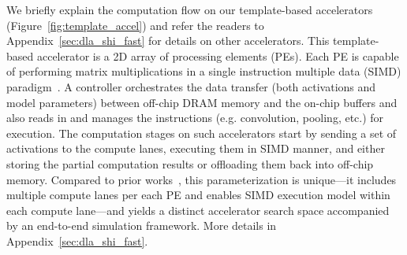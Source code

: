 %
We briefly explain the computation flow on our template-based accelerators (Figure~\ref{fig:template_accel}) and refer the readers to Appendix~\ref{sec:dla_shi_fast} for details on other accelerators.
%
This template-based accelerator is a 2D array of processing elements (PEs). Each PE is capable of performing matrix multiplications in a single instruction multiple data (SIMD) paradigm~\citep{simd}. A controller orchestrates the data transfer (both activations and model parameters) between off-chip DRAM memory and the on-chip buffers and also reads in and manages the instructions (e.g. convolution, pooling, etc.) for execution. The computation stages on such accelerators start by sending a set of activations to the compute lanes, executing them in SIMD manner, and either storing the partial computation results or offloading them back into off-chip memory.
%
Compared to prior works~\citep{hegdemind,shidiannao,kao2020confuciux}, this parameterization is unique---it includes multiple compute lanes per each PE and enables SIMD execution model within each compute lane---and yields a distinct accelerator search space accompanied by an end-to-end simulation framework. More details in Appendix~\ref{sec:dla_shi_fast}.
%
